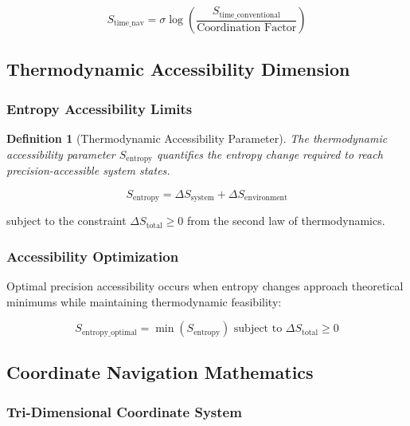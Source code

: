 \documentclass[12pt,a4paper]{article}
\newtheorem{definition}[theorem]{Definition}
\begin{document}
{\begin{equation}
S_{\text{time\_nav}} = \sigma \log\left(\frac{S_{\text{time\_conventional}}}{\text{Coordination Factor}}\right)
\label{eq:temporal_navigation}
\end{equation}

\subsection{Thermodynamic Accessibility Dimension}

\subsubsection{Entropy Accessibility Limits}

\begin{definition}[Thermodynamic Accessibility Parameter]
The thermodynamic accessibility parameter $S_{\text{entropy}}$ quantifies the entropy change required to reach precision-accessible system states.
\end{definition}

\begin{equation}
S_{\text{entropy}} = \Delta S_{\text{system}} + \Delta S_{\text{environment}}
\label{eq:thermodynamic_accessibility}
\end{equation}

subject to the constraint $\Delta S_{\text{total}} \geq 0$ from the second law of thermodynamics.

\subsubsection{Accessibility Optimization}

Optimal precision accessibility occurs when entropy changes approach theoretical minimums while maintaining thermodynamic feasibility:

\begin{equation}
S_{\text{entropy\_optimal}} = \min\left(S_{\text{entropy}}\right) \text{ subject to } \Delta S_{\text{total}} \geq 0
\label{eq:entropy_optimization}
\end{equation}

\subsection{Coordinate Navigation Mathematics}

\subsubsection{Tri-Dimensional Coordinate System}

}
\end{document}

